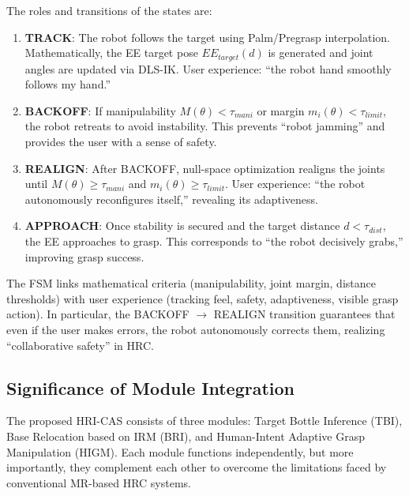 \documentclass[../../main.tex]{subfiles} %
\begin{document}
The roles and transitions of the states are:

\begin{enumerate}
  \item \textbf{TRACK}:  
  The robot follows the target using Palm/Pregrasp interpolation.  
  Mathematically, the EE target pose $EE_{target}(d)$ is generated 
  and joint angles are updated via DLS-IK.  
  User experience: “the robot hand smoothly follows my hand.”

  \item \textbf{BACKOFF}:  
  If manipulability $M(\theta)<\tau_{mani}$ or margin $m_i(\theta)<\tau_{limit}$, 
  the robot retreats to avoid instability.  
  This prevents “robot jamming” and provides the user with a sense of safety.

  \item \textbf{REALIGN}:  
  After BACKOFF, null-space optimization realigns the joints 
  until $M(\theta)\geq \tau_{mani}$ and $m_i(\theta)\geq \tau_{limit}$.  
  User experience: “the robot autonomously reconfigures itself,” revealing its adaptiveness.

  \item \textbf{APPROACH}:  
  Once stability is secured and the target distance $d<\tau_{dist}$, 
  the EE approaches to grasp.  
  This corresponds to “the robot decisively grabs,” improving grasp success.
\end{enumerate}

The FSM links mathematical criteria (manipulability, joint margin, distance thresholds) with 
user experience (tracking feel, safety, adaptiveness, visible grasp action).  
In particular, the BACKOFF $\to$ REALIGN transition guarantees that even if the user makes errors, 
the robot autonomously corrects them, realizing “collaborative safety” in HRC.



\subsection{Significance of Module Integration}

The proposed HRI-CAS consists of three modules: Target Bottle Inference (TBI), 
Base Relocation based on IRM (BRI), 
and Human-Intent Adaptive Grasp Manipulation (HIGM).  
Each module functions independently, but more importantly, 
they complement each other to overcome 
the limitations faced by conventional MR-based HRC systems.
\end{document}
